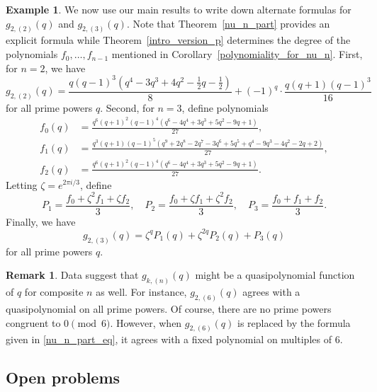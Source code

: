 \documentclass[10pt]{article}
\theoremstyle{definition}
\newtheorem{remark}[theorem]{Remark}
\newtheorem{example}[theorem]{Example}
\begin{document}
\begin{example}
We now use our main results to write down alternate formulas for \(g_{2,(2)} (q)\) and \(g_{2,(3)} (q)\).
Note that Theorem~\ref{nu_n_part} provides an explicit formula while Theorem~\ref{intro_version_p} determines the degree of the polynomials \(f_0,\ldots,f_{n-1}\) mentioned in Corollary~\ref{polynomiality_for_nu_n}.
First, for \(n = 2\), we have
\begin{equation}
g_{2,(2)}(q)
=
\frac{q (q - 1)^3 (q^4 - 3q^3 + 4q^2 - \tfrac{1}{2}q - \tfrac{1}{2})}{8}
+(-1)^q
\cdot
\frac{q(q + 1)(q - 1)^3}{16}
\end{equation}
for all prime powers \(q\).
Second, for \(n = 3\), define polynomials
\begin{align*}
f_0 (q) & = \frac{q^6 (q + 1)^2 (q - 1)^4  (q^6 - 4q^4 + 3q^3 + 5q^2 - 9q + 1)}{27}, \\
f_1 (q) & = \frac{q^3 (q + 1)  (q - 1)^5 (q^9 + 2q^8 - 2q^7 - 3q^6 + 5q^5 + q^4 - 9q^3 - 4q^2 - 2q + 2)}{27}, \\
f_2 (q) & = \frac{q^6 (q + 1)^2 (q - 1)^4  (q^6 - 4q^4 + 3q^3 + 5q^2 - 9q + 1)}{27}.
\end{align*}
Letting \(\zeta = e^{2 \pi i / 3}\), define
\begin{equation*}
P_1 = \frac{f_0 + \zeta^2 f_1 + \zeta f_2}{3},
\quad
P_2 = \frac{f_0 + \zeta f_1 + \zeta^2 f_2}{3},
\quad
P_3 = \frac{f_0 + f_1 + f_2}{3}.
\end{equation*}
Finally, we have
\begin{equation}
g_{2,(3)} (q) = \zeta^q P_1(q) + \zeta^{2q} P_2(q) + P_3(q)
\end{equation}
for all prime powers \(q\).
\end{example}





\begin{remark}
\label{bummer}
Data suggest that \(g_{k,(n)}(q)\) might be a quasipolynomial function of \(q\) for composite \(n\) as well.
For instance, \(g_{2,(6)}(q)\) agrees with a quasipolynomial on all prime powers.
Of course, there are no prime powers congruent to \(0 \pmod{6}\).
However, when \(g_{2,(6)}(q)\) is replaced by the formula given in \eqref{nu_n_part_eq}, it agrees with a fixed polynomial on multiples of \(6\).
\end{remark}






\subsection{Open problems}
\end{document}

